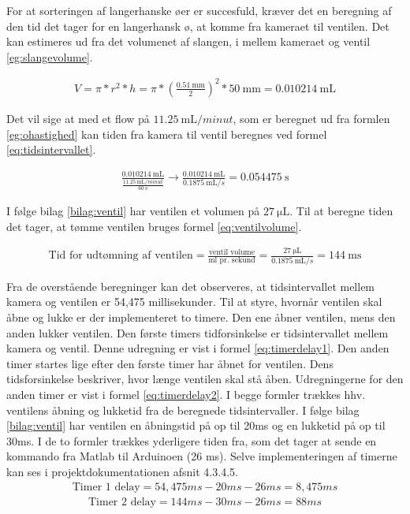 For at sorteringen af langerhanske øer er succesfuld, kræver det en beregning af den tid det tager for en langerhansk ø, at komme fra kameraet til ventilen. Det kan estimeres ud fra det volumenet af slangen, i mellem kameraet og ventil \ref{eg:slangevolume}.

\begin{align}
V=\pi*r^2*h=\pi*(\frac{\SI{0,51}{\milli\metre}}{2})^2*\SI{50}{\milli\metre}=\SI{0,010214}{\milli\liter}
\label{eg:slangevolume}
\end{align}

 Det vil sige at med et flow på $\SI{11,25}{\milli\liter/minut}$, som er beregnet ud fra formlen \ref{eg:ohastighed} kan tiden fra kamera til ventil beregnes ved formel \ref{eq:tidsintervallet}. 
 
\begin{align}
\frac{\SI{0,010214}{\milli\liter}}{\frac{\SI{11,25}{\milli\liter/minut}}{\SI{60}{\second}}}\to\frac{\SI{0,010214}{\milli\liter}}{\SI{0,1875}{\milli\liter/s}}=\SI{0.054475}{\second}
\label{eq:tidsintervallet}
\end{align} 

I følge bilag \ref{bilag:ventil} har ventilen et volumen på $\SI{27}{\micro\liter}$. Til at beregne tiden det tager, at tømme ventilen bruges formel \ref{eq:ventilvolume}. %

\begin{align}
\text{Tid for udtømning af ventilen} = \frac{\text{ventil volume}}{\text{ml pr. sekund}}=\frac{\SI{27}{\micro\liter}}{\SI{0,1875}{\milli\liter/s}}=\SI{144}{\milli\second}
\label{eq:ventilvolume}
\end{align}

Fra de overstående beregninger kan det observeres, at tidsintervallet mellem kamera og ventilen er 54,475 millisekunder. Til at styre, hvornår ventilen skal åbne og lukke er der implementeret to timere. Den ene åbner ventilen, mens den anden lukker ventilen. Den første timers tidforsinkelse er tidsintervallet mellem kamera og ventil. Denne udregning er vist i formel \ref{eq:timerdelay1}. Den anden timer startes lige efter den første timer har åbnet for ventilen. Dens tidsforsinkelse beskriver, hvor længe ventilen skal stå åben. Udregningerne for den anden timer er vist i formel \ref{eq:timerdelay2}. I begge formler trækkes hhv. ventilens åbning og lukketid fra de beregnede tidsintervaller. I følge bilag \ref{bilag:ventil} har ventilen en åbningstid på op til 20ms og en lukketid på op til 30ms. I de to formler trækkes yderligere tiden fra, som det tager at sende en kommando fra Matlab til Arduinoen (26 ms). Selve implementeringen af timerne kan ses i projektdokumentationen afsnit 4.3.4.5. 
\begin{align}
\text{Timer 1 delay}=54,475ms-20ms-26ms=8,475ms
\label{eq:timerdelay1}
\end{align} 
\begin{align}
\text{Timer 2 delay}=144ms-30ms-26ms= 88ms
\label{eq:timerdelay2}
\end{align} 

